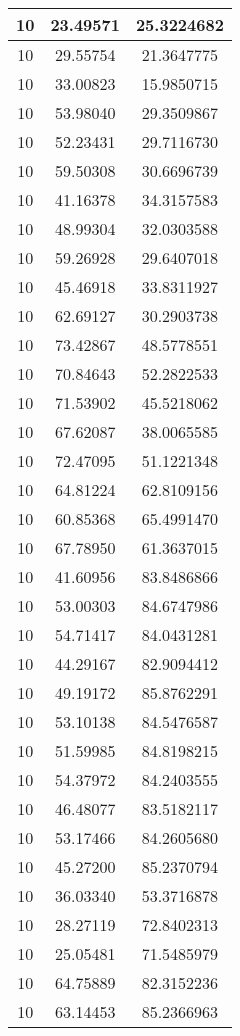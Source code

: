 \documentclass[
]{book}
\begin{document}
\begin{tabular}{c|c|c}
\hline
10 & 23.49571 & 25.3224682\\
\hline
10 & 29.55754 & 21.3647775\\
\hline
10 & 33.00823 & 15.9850715\\
\hline
10 & 53.98040 & 29.3509867\\
\hline
10 & 52.23431 & 29.7116730\\
\hline
10 & 59.50308 & 30.6696739\\
\hline
10 & 41.16378 & 34.3157583\\
\hline
10 & 48.99304 & 32.0303588\\
\hline
10 & 59.26928 & 29.6407018\\
\hline
10 & 45.46918 & 33.8311927\\
\hline
10 & 62.69127 & 30.2903738\\
\hline
10 & 73.42867 & 48.5778551\\
\hline
10 & 70.84643 & 52.2822533\\
\hline
10 & 71.53902 & 45.5218062\\
\hline
10 & 67.62087 & 38.0065585\\
\hline
10 & 72.47095 & 51.1221348\\
\hline
10 & 64.81224 & 62.8109156\\
\hline
10 & 60.85368 & 65.4991470\\
\hline
10 & 67.78950 & 61.3637015\\
\hline
10 & 41.60956 & 83.8486866\\
\hline
10 & 53.00303 & 84.6747986\\
\hline
10 & 54.71417 & 84.0431281\\
\hline
10 & 44.29167 & 82.9094412\\
\hline
10 & 49.19172 & 85.8762291\\
\hline
10 & 53.10138 & 84.5476587\\
\hline
10 & 51.59985 & 84.8198215\\
\hline
10 & 54.37972 & 84.2403555\\
\hline
10 & 46.48077 & 83.5182117\\
\hline
10 & 53.17466 & 84.2605680\\
\hline
10 & 45.27200 & 85.2370794\\
\hline
10 & 36.03340 & 53.3716878\\
\hline
10 & 28.27119 & 72.8402313\\
\hline
10 & 25.05481 & 71.5485979\\
\hline
10 & 64.75889 & 82.3152236\\
\hline
10 & 63.14453 & 85.2366963\\

\end{tabular}
\end{document}
